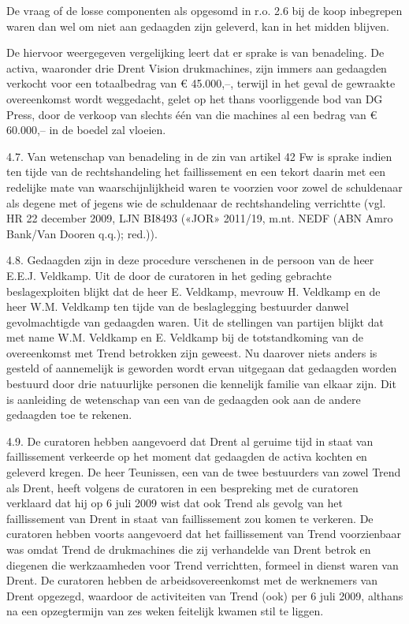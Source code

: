 \documentclass[
  dutch,
  a4paper,
]{article}
\begin{document}
De vraag of de losse componenten als opgesomd in r.o. 2.6 bij de koop inbegrepen waren dan wel om niet aan gedaagden zijn geleverd, kan in het midden blijven.

De hiervoor weergegeven vergelijking leert dat er sprake is van benadeling. De activa, waaronder drie Drent Vision drukmachines, zijn immers aan gedaagden verkocht voor een totaalbedrag van € 45.000,--, terwijl in het geval de gewraakte overeenkomst wordt weggedacht, gelet op het thans voorliggende bod van DG Press, door de verkoop van slechts één van die machines al een bedrag van € 60.000,-- in de boedel zal vloeien.

4.7. Van wetenschap van benadeling in de zin van artikel 42 Fw is sprake indien ten tijde van de rechtshandeling het faillissement en een tekort daarin met een redelijke mate van waarschijnlijkheid waren te voorzien voor zowel de schuldenaar als degene met of jegens wie de schuldenaar de rechtshandeling verrichtte (vgl. HR 22 december 2009, LJN BI8493 («JOR» 2011/19, m.nt. NEDF (ABN Amro Bank/Van Dooren q.q.); red.)).

4.8. Gedaagden zijn in deze procedure verschenen in de persoon van de heer E.E.J. Veldkamp. Uit de door de curatoren in het geding gebrachte beslagexploiten blijkt dat de heer E. Veldkamp, mevrouw H. Veldkamp en de heer W.M. Veldkamp ten tijde van de beslaglegging bestuurder danwel gevolmachtigde van gedaagden waren. Uit de stellingen van partijen blijkt dat met name W.M. Veldkamp en E. Veldkamp bij de totstandkoming van de overeenkomst met Trend betrokken zijn geweest. Nu daarover niets anders is gesteld of aannemelijk is geworden wordt ervan uitgegaan dat gedaagden worden bestuurd door drie natuurlijke personen die kennelijk familie van elkaar zijn. Dit is aanleiding de wetenschap van een van de gedaagden ook aan de andere gedaagden toe te rekenen.

4.9. De curatoren hebben aangevoerd dat Drent al geruime tijd in staat van faillissement verkeerde op het moment dat gedaagden de activa kochten en geleverd kregen. De heer Teunissen, een van de twee bestuurders van zowel Trend als Drent, heeft volgens de curatoren in een bespreking met de curatoren verklaard dat hij op 6 juli 2009 wist dat ook Trend als gevolg van het faillissement van Drent in staat van faillissement zou komen te verkeren. De curatoren hebben voorts aangevoerd dat het faillissement van Trend voorzienbaar was omdat Trend de drukmachines die zij verhandelde van Drent betrok en diegenen die werkzaamheden voor Trend verrichtten, formeel in dienst waren van Drent. De curatoren hebben de arbeidsovereenkomst met de werknemers van Drent opgezegd, waardoor de activiteiten van Trend (ook) per 6 juli 2009, althans na een opzegtermijn van zes weken feitelijk kwamen stil te liggen.
\end{document}
